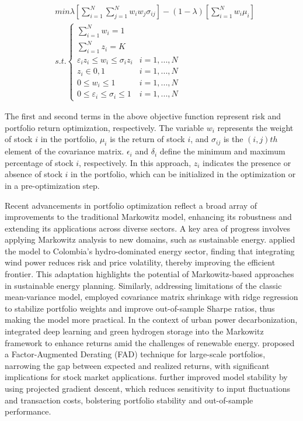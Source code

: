 \documentclass[preprint,12pt,authoryear]{elsarticle}
\begin{document}
\begin{equation}\label{Markowitz}
\begin{split}
& min \lambda\left[ \sum_{i=1}^{N}\sum_{j=1}^{N}w_i w_j\sigma_{ij} \right] - (1-\lambda)\left[ \sum_{i=1}^{N}w_i\mu_i \right] \\
& s.t.\begin {cases}
    \sum_{i=1}^{N} w_i=1 & \\ \sum_{i=1}^{N} z_i=K & \\ \varepsilon_i z_i\le w_i\le \sigma_i z_i & i=1, ..., N \\ z_{i} \in {0,1} & i=1, ..., N \\ 0\le w_i\le 1 & i=1, ..., N \\ 0\le \varepsilon_{i}\le \sigma_{i}\le 1 & i=1, ..., N 
\end {cases}
\end{split}
\end{equation}

The first and second terms in the above objective function represent risk and portfolio return optimization, respectively. The variable $w_{i}$ represents the weight of stock $i$ in the portfolio, $\mu_i$ is the return of stock $i$, and $\sigma_{ij}$ is the $(i,j)th$ element of the covariance matrix. $\epsilon_{i}$ and $\delta_i$ define the minimum and maximum percentage of stock $i$, respectively. In this approach, $z_i$  indicates the presence or absence of stock $i$ in the portfolio, which can be initialized in the optimization or in a pre-optimization step.

Recent advancements in portfolio optimization reflect a broad array of improvements to the traditional Markowitz model, enhancing its robustness and extending its applications across diverse sectors. A key area of progress involves applying Markowitz analysis to new domains, such as sustainable energy. \cite{Botero2024} applied the model to Colombia's hydro-dominated energy sector, finding that integrating wind power reduces risk and price volatility, thereby improving the efficient frontier. This adaptation highlights the potential of Markowitz-based approaches in sustainable energy planning. Similarly, addressing limitations of the classic mean-variance model,  \cite{Ortiz2023} employed covariance matrix shrinkage with ridge regression to stabilize portfolio weights and improve out-of-sample Sharpe ratios, thus making the model more practical. In the context of urban power decarbonization, \cite{Yang2024} integrated deep learning and green hydrogen storage into the Markowitz framework to enhance returns amid the challenges of renewable energy.\cite{Hui2024} proposed a Factor-Augmented Derating (FAD) technique for large-scale portfolios, narrowing the gap between expected and realized returns, with significant implications for stock market applications. \cite{Petukhina2024} further improved model stability by using projected gradient descent, which reduces sensitivity to input fluctuations and transaction costs, bolstering portfolio stability and out-of-sample performance.
\end{document}
